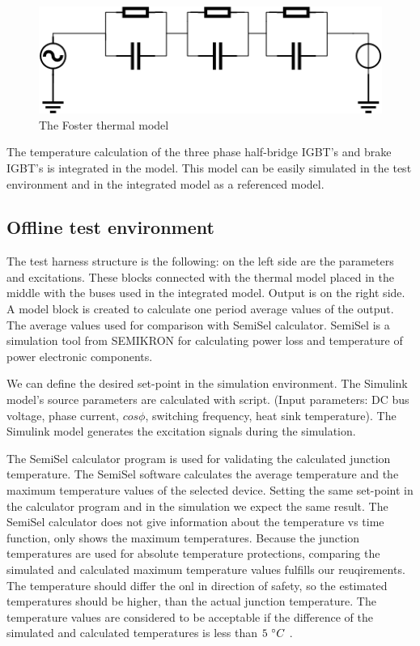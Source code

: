 \begin{figure}[!h]
\centering
\includegraphics[width=0.9\columnwidth]{figures/foster.png}
\caption{The Foster thermal model}
\label{fig:foster}
\end{figure}

The temperature calculation of the three phase half-bridge IGBT's and brake IGBT's is integrated in the model. This model can be easily simulated in the test environment and in the integrated model as a referenced model.

\subsection{Offline test environment}

The test harness structure is the following: on the left side are the parameters and excitations. These blocks connected with the thermal model placed in the middle with the buses used in the integrated model. Output is on the right side. A model block is created to calculate one period average values of the output. The average values used for comparison with SemiSel calculator. SemiSel is a simulation tool from SEMIKRON for calculating power loss and temperature of power electronic components.

We can define the desired set-point in the simulation environment. The Simulink model's source parameters are calculated with script. (Input parameters: DC bus voltage, phase current, $cos\phi{}$, switching frequency, heat sink temperature). The Simulink model generates the excitation signals during the simulation.

The SemiSel calculator program is used for validating the calculated junction temperature. The SemiSel software calculates the average temperature and the maximum temperature values of the selected device. Setting the same set-point in the calculator program and in the simulation we expect the same result. The  SemiSel calculator does not give information about the temperature vs time function, only shows the maximum temperatures. Because the junction temperatures are used for absolute temperature protections, comparing the simulated and calculated maximum temperature values fulfills our reuqirements. The temperature should differ the onl in direction of safety, so the estimated temperatures should be higher, than the actual junction temperature. The temperature values are considered to be acceptable if the difference of the simulated and calculated temperatures is less than $5\ \degree{}C$ .

